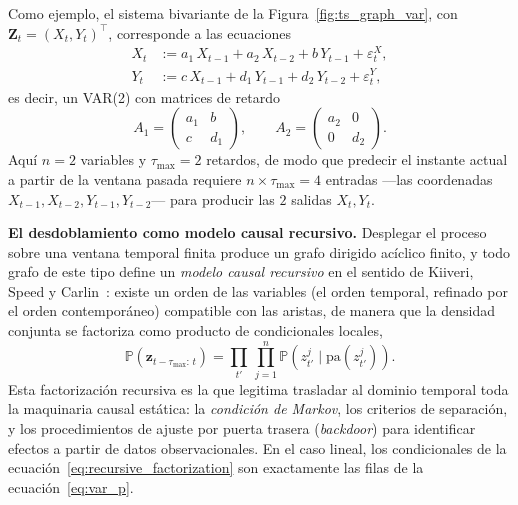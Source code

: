 \documentclass[12pt]{report} %
\begin{document}
Como ejemplo, el sistema bivariante de la Figura~\ref{fig:ts_graph_var}, con $\mathbf{Z}_t = (X_t, Y_t)^\top$, corresponde a las ecuaciones
\begin{equation}
    \begin{aligned}
        X_t & := a_1\,X_{t-1} + a_2\,X_{t-2} + b\,Y_{t-1} + \varepsilon^X_t, \\
        Y_t & := c\,X_{t-1} + d_1\,Y_{t-1} + d_2\,Y_{t-2} + \varepsilon^Y_t,
    \end{aligned}
    \label{eq:var2_bivariate}
\end{equation}
es decir, un VAR(2) con matrices de retardo
\begin{equation*}
    A_1 = \begin{pmatrix} a_1 & b \\ c & d_1 \end{pmatrix}, \qquad
    A_2 = \begin{pmatrix} a_2 & 0 \\ 0 & d_2 \end{pmatrix}.
\end{equation*}
Aquí $n = 2$ variables y $\tau_{\max} = 2$ retardos, de modo que predecir el instante actual a partir de la ventana pasada requiere $n \times \tau_{\max} = 4$ entradas ---las coordenadas $X_{t-1}, X_{t-2}, Y_{t-1}, Y_{t-2}$--- para producir las $2$ salidas $X_t, Y_t$.

\textbf{El desdoblamiento como modelo causal recursivo.} Desplegar el proceso sobre una ventana temporal finita produce un grafo dirigido acíclico finito, y todo grafo de este tipo define un \emph{modelo causal recursivo} en el sentido de Kiiveri, Speed y Carlin~\cite{Kiiveri_Speed_Carlin_1984}: existe un orden de las variables (el orden temporal, refinado por el orden contemporáneo) compatible con las aristas, de manera que la densidad conjunta se factoriza como producto de condicionales locales,
\begin{equation}
    \mathbb{P}\!\left(\mathbf{z}_{t-\tau_{\max}:\,t}\right) = \prod_{t'}\,\prod_{j=1}^{n} \mathbb{P}\!\left(z^j_{t'} \mid \mathrm{pa}(z^j_{t'})\right).
    \label{eq:recursive_factorization}
\end{equation}
Esta factorización recursiva es la que legitima trasladar al dominio temporal toda la maquinaria causal estática: la \emph{condición de Markov}, los criterios de separación, y los procedimientos de ajuste por puerta trasera (\textit{backdoor}) para identificar efectos a partir de datos observacionales. En el caso lineal, los condicionales de la ecuación~\eqref{eq:recursive_factorization} son exactamente las filas de la ecuación~\eqref{eq:var_p}.
\end{document}

